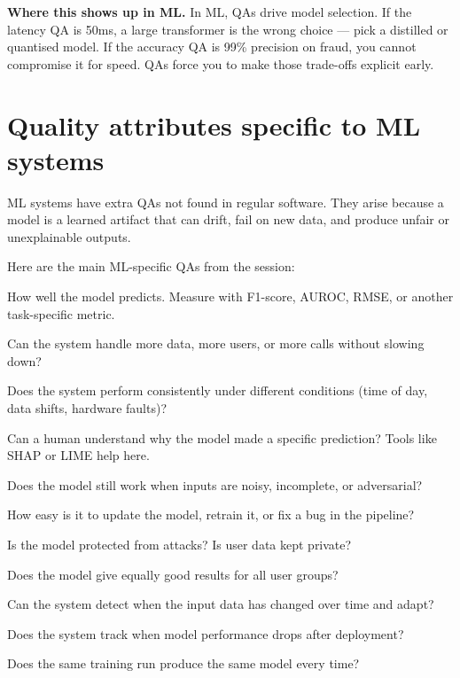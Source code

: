 \documentclass[a4paper,11pt]{article}
\begin{document}
\noindent\textbf{Where this shows up in ML.}
In ML, QAs drive model selection. If the latency QA is 50ms, a large
transformer is the wrong choice — pick a distilled or quantised model.
If the accuracy QA is 99\% precision on fraud, you cannot compromise it
for speed. QAs force you to make those trade-offs explicit early.

\section{Quality attributes specific to ML systems}

ML systems have extra QAs not found in regular software. They arise because
a model is a learned artifact that can drift, fail on new data, and produce
unfair or unexplainable outputs.

Here are the main ML-specific QAs from the session:

\begin{description}[leftmargin=9em,style=nextline,font=\normalfont\bfseries\color{navy}]
  \item[Accuracy]
        How well the model predicts. Measure with F1-score, AUROC, RMSE,
        or another task-specific metric.
  \item[Scalability]
        Can the system handle more data, more users, or more calls
        without slowing down?
  \item[Reliability]
        Does the system perform consistently under different conditions
        (time of day, data shifts, hardware faults)?
  \item[Explainability]
        Can a human understand why the model made a specific prediction?
        Tools like SHAP or LIME help here.
  \item[Robustness]
        Does the model still work when inputs are noisy, incomplete,
        or adversarial?
  \item[Maintainability]
        How easy is it to update the model, retrain it, or fix a bug
        in the pipeline?
  \item[Security \& Privacy]
        Is the model protected from attacks? Is user data kept private?
  \item[Fairness]
        Does the model give equally good results for all user groups?
  \item[Data Drift Adaptability]
        Can the system detect when the input data has changed over time
        and adapt?
  \item[Model Drift Monitoring]
        Does the system track when model performance drops after
        deployment?
  \item[Reproducibility]
        Does the same training run produce the same model every time?
\end{description}
\end{document}
